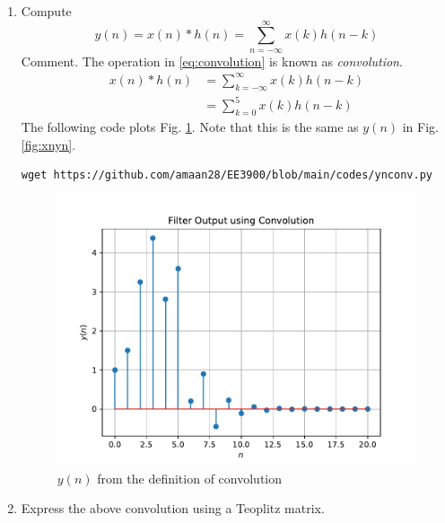 \documentclass[journal,12pt,twocolumn]{IEEEtran}
\let\vec\mathbf
\renewcommand\thesection{\arabic{section}}
\begin{document}
\begin{enumerate}[label=\thesection.\arabic*]
	\item Compute 
	\begin{equation}
		\label{eq:convolution}
		y(n) = x(n)*h(n) = \sum_{n=-\infty}^{\infty}x(k)h(n-k)
	\end{equation}
	Comment. The operation in \eqref{eq:convolution} is known as
	{\em convolution}.
	\\
	\solution 
	\begin{align}
		x(n)*h(n) &= \sum_{k=-\infty}^{\infty}x(k)h(n-k) \\
		&= \sum_{k=0}^{5}x(k)h(n-k)
	\end{align}
	The following code plots Fig. \ref{fig:ynconv}. Note that this is the same as 
	$y(n)$ in  Fig. 
	\ref{fig:xnyn}. 
\begin{lstlisting}
wget https://github.com/amaan28/EE3900/blob/main/codes/ynconv.py
\end{lstlisting}
	\begin{figure}[!ht]
		\centering
		\includegraphics[width=\columnwidth]{./figs/ynconv}
		\caption{$y(n)$ from the definition of convolution}
		\label{fig:ynconv}
	\end{figure}
	\item Express the above convolution using a Teoplitz matrix.\\
	\solution
	

\end{enumerate}
\end{document}
